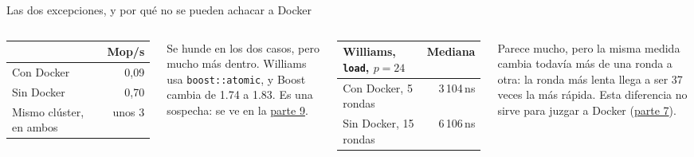 \begin{frame}{Las dos excepciones, y por qué no se pueden achacar a Docker}
  \begin{columns}[T]
    \small
    \begin{tabular}{@{}lr@{}}
      \toprule
      & \textbf{Mop/s}\\
      \midrule
      Con Docker & 0,09\\
      Sin Docker & 0,70\\
      Mismo clúster, en ambos & unos 3\\
      \bottomrule
    \end{tabular}
    \par\medskip\footnotesize
    Se hunde en los dos casos, pero mucho más dentro. Williams usa \texttt{boost::atomic}, y Boost cambia de 1.74 a 1.83. Es una sospecha: se ve en la \hyperlink{parte9}{parte 9}.
    \small
    \begin{tabular}{@{}lr@{}}
      \toprule
      \textbf{Williams, \texttt{load}, $p = 24$} & \textbf{Mediana}\\
      \midrule
      Con Docker, 5 rondas & 3\,104\,ns\\
      Sin Docker, 15 rondas & 6\,106\,ns\\
      \bottomrule
    \end{tabular}
    \par\medskip\footnotesize
    Parece mucho, pero la misma medida cambia todavía más de una ronda a otra: la ronda más lenta llega a ser 37 veces la más rápida. Esta diferencia no sirve para juzgar a Docker (\hyperlink{parte7}{parte 7}).
  \end{columns}
  \vfill
\end{frame}
